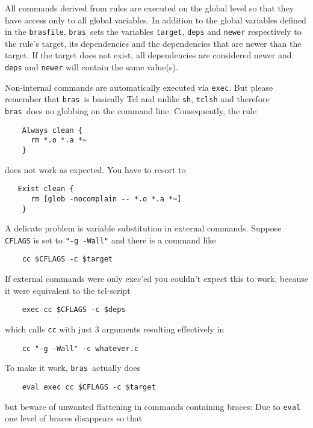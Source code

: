 \documentclass[12pt]{article}
\newcommand{\bras}{\texttt{bras}}
\begin{document}
All commands derived from rules are executed on the global level
so that they have access only to all global variables. In addition
to the global variables defined in the
\texttt{brasfile}, \bras\ sets the variables \texttt{target},
\texttt{deps} and \texttt{newer} respectively to the rule's target, its
dependencies and the dependencies that are newer than the target. If
the target does not exist, all dependencies are considered newer and
\texttt{deps} and \texttt{newer} will contain the same value(s).

Non-internal commands are automatically executed
via \texttt{exec}. But please remember that \bras\ is basically
Tcl and unlike \texttt{sh}, \texttt{tclsh} and therefore \bras\ does no
globbing on the command line. Consequently, the rule
\begin{verbatim}
    Always clean {
      rm *.o *.a *~
    }
\end{verbatim}
does not work as expected. You have to resort to
\begin{verbatim}
   Exist clean {
      rm [glob -nocomplain -- *.o *.a *~]
    }
\end{verbatim}
    
A delicate problem is variable substitution in
external commands. Suppose \texttt{CFLAGS} is set to 
\texttt{"-g -Wall"} and there is a command like 

\begin{verbatim}
    cc $CFLAGS -c $target
\end{verbatim}

If external commands were only exec'ed you couldn't expect this to
work, because it were equivalent to the tcl-script

\begin{verbatim}
    exec cc $CFLAGS -c $deps
\end{verbatim}

which calls \texttt{cc} with just 3 arguments resulting effectively in

\begin{verbatim}
    cc "-g -Wall" -c whatever.c
\end{verbatim}

To make it work, \bras\ actually does

\begin{verbatim}
    eval exec cc $CFLAGS -c $target
\end{verbatim}

but beware of unwanted flattening in commands containing braces: Due
to \texttt{eval} one level of braces
disappears so that
\end{document}
